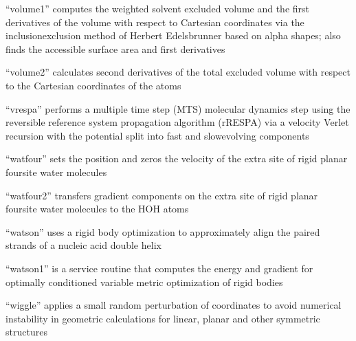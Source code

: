 \documentclass[letterpaper,11pt,english]{sphinxmanual}
\begin{document}
\sphinxAtStartPar
“volume1” computes the weighted solvent excluded volume and the first derivatives of the volume with respect to Cartesian coordinates via the inclusion\sphinxhyphen{}exclusion method of Herbert Edelsbrunner based on alpha shapes; also finds the accessible surface area and first derivatives

\sphinxAtStartPar
{}

\sphinxAtStartPar
“volume2” calculates second derivatives of the total excluded volume with respect to the Cartesian coordinates of the atoms

\sphinxAtStartPar
{}

\sphinxAtStartPar
“vrespa” performs a multiple time step (MTS) molecular dynamics step using the reversible reference system propagation algorithm (r\sphinxhyphen{}RESPA) via a velocity Verlet recursion with the potential split into fast\sphinxhyphen{} and slow\sphinxhyphen{}evolving components

\sphinxAtStartPar
{}

\sphinxAtStartPar
“watfour” sets the position and zeros the velocity of the extra site of rigid planar four\sphinxhyphen{}site water molecules

\sphinxAtStartPar
{}

\sphinxAtStartPar
“watfour2” transfers gradient components on the extra site of rigid planar four\sphinxhyphen{}site water molecules to the H\sphinxhyphen{}O\sphinxhyphen{}H atoms

\sphinxAtStartPar
{}

\sphinxAtStartPar
“watson” uses a rigid body optimization to approximately align the paired strands of a nucleic acid double helix

\sphinxAtStartPar
{}

\sphinxAtStartPar
“watson1” is a service routine that computes the energy and gradient for optimally conditioned variable metric optimization of rigid bodies

\sphinxAtStartPar
{}

\sphinxAtStartPar
“wiggle” applies a small random perturbation of coordinates to avoid numerical instability in geometric calculations for linear, planar and other symmetric structures

\sphinxAtStartPar
{}
\end{document}
